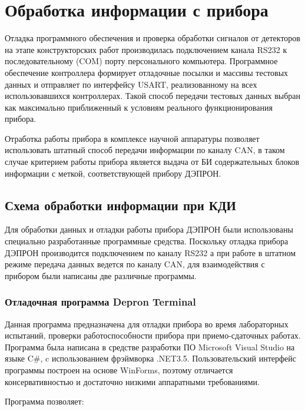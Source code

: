 \chapter{Обработка информации с прибора} \label{chapt3}


Отладка программного обеспечения и проверка обработки сигналов от детекторов на этапе  конструкторских работ производилась подключением канала RS232 к последовательному (COM) порту персонального компьютера. Программное обеспечение контроллера формирует отладочные посылки и массивы тестовых данных и отправляет по интерфейсу USART, реализованному на всех использовавшихся контроллерах. Такой способ передачи тестовых данных выбран как максимально приближенный к условиям реального функционирования прибора. 

Отработка работы прибора в комплексе научной аппаратуры позволяет использовать штатный способ передачи информации по каналу CAN, в таком случае критерием работы прибора является выдача от БИ содержательных блоков информации с меткой, соответствующей прибору ДЭПРОН. 

\section{Схема обработки информации при КДИ}\label{sec3.1}

Для обработки данных и отладки работы прибора ДЭПРОН были использованы специально разработанные программные средства. Поскольку отладка прибора ДЭПРОН производится подключением по каналу RS232 а при работе в штатном режиме передача данных ведется по каналу CAN, для взаимодействия с прибором были написаны две различные программы.

\subsection{Отладочная программа Depron Terminal}

Данная программа предназначена для отладки прибора во время лабораторных испытаний, проверки работоспособности прибора при приемо-сдаточных работах. Программа была написана в средстве разработки ПО Microsoft Visual Studio на языке C\#, c использованием фрэймворка .NET3.5. Пользовательский интерфейс программы построен на основе WinForms, поэтому отличается консервативностью и достаточно низкими аппаратными требованиями.

Программа позволяет:


